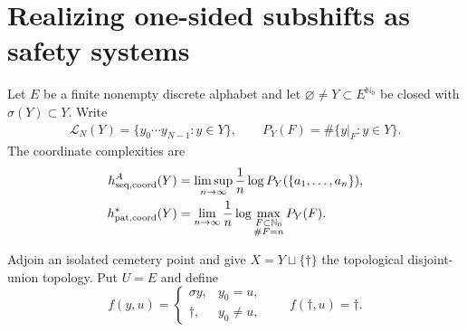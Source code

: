\documentclass[11pt,reqno]{amsart}
\numberwithin{equation}{section}
\theoremstyle{definition}
\newcommand{\Nzero}{\mathbb N_0}
\newcommand{\Lcal}{\mathcal L}
\begin{document}
\section{Realizing one-sided subshifts as safety systems}\label{sec:realization}

Let $E$ be a finite nonempty discrete alphabet and let
$\varnothing\ne Y\subset E^{\Nzero}$ be closed with $\sigma(Y)\subset Y$.
Write
\begin{align*}
 \Lcal_N(Y)=\{y_0\cdots y_{N-1}:y\in Y\},
 \qquad
 P_Y(F)=\#\{y|_F:y\in Y\}.
\end{align*}
The coordinate complexities are
\begin{align*}
 h_{\rm seq,coord}^A(Y)
 &=\limsup_{n\to\infty}\frac1n
   \log P_Y(\{a_1,\ldots,a_n\}),\\
 h_{\rm pat,coord}^*(Y)
 &=\lim_{n\to\infty}\frac1n
   \log\max_{\substack{F\subset\Nzero\\\#F=n}}P_Y(F).
\end{align*}

Adjoin an isolated cemetery point and give
$X=Y\sqcup\{\dagger\}$ the topological disjoint-union topology.  Put $U=E$
and define
\begin{equation}\label{eq:matching-control}
 f(y,u)=
 \begin{cases}
   \sigma y,&y_0=u,\\
   \dagger,&y_0\ne u,
 \end{cases}
 \qquad
 f(\dagger,u)=\dagger.
\end{equation}
\end{document}
